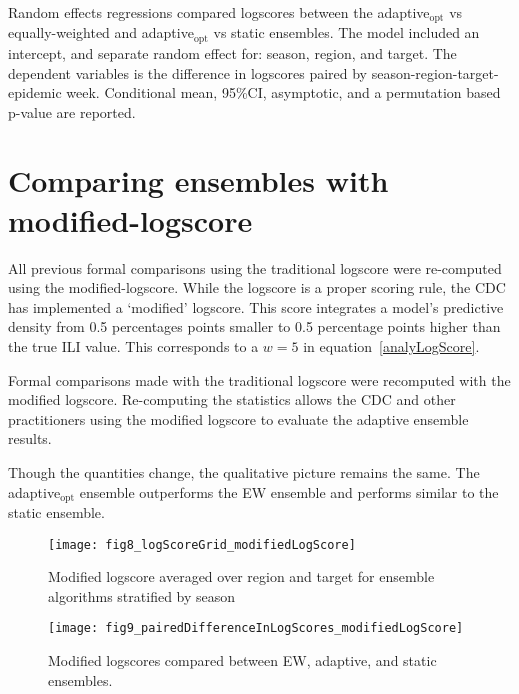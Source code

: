\documentclass[12pt]{article}
\begin{document}
\begin{table}[ht!]
\caption{
Random effects regressions compared logscores between the adaptive$_{\text{opt}}$ vs equally-weighted and adaptive$_{\text{opt}}$ vs static ensembles.
The model included an intercept, and separate random effect for: season, region, and target.
The dependent variables is the difference in logscores paired by season-region-target-epidemic week.
Conditional mean, 95\%CI, asymptotic, and a permutation based p-value are reported.}

\end{table}


\clearpage
\section{Comparing ensembles with modified-logscore}
\label{suppl4.comparison}

All previous formal comparisons using the traditional logscore were re-computed using the modified-logscore.
While the logscore is a proper scoring rule, the CDC has implemented a `modified' logscore.
This score integrates a model's predictive density from 0.5 percentages points smaller to 0.5 percentage points higher than the true ILI value.
This corresponds to a $w=5$ in equation~\ref{analyLogScore}.

Formal comparisons made with the traditional logscore were recomputed with the modified logscore.
Re-computing the statistics allows the CDC and other practitioners using the modified logscore to evaluate the adaptive ensemble results.

Though the quantities change, the qualitative picture remains the same.
The adaptive$_{\text{opt}}$ ensemble outperforms the EW ensemble and performs similar to the static ensemble.

\graphicspath{{../_6_TLGs/_G/fig8_logScoreGrid_modifiedLogScore/}}
\begin{figure}[ht!]
  \centering
  \texttt{[image: fig8\_logScoreGrid\_modifiedLogScore]}
  \caption{ Modified logscore averaged over region and target for ensemble algorithms stratified by season \label{fig8.logScoreGrid__modifiedLogScore}}
\end{figure}

\graphicspath{{../_6_TLGs/_G/fig9_pairedDifferenceInLogScores_modifiedLogScore/}}
\begin{figure}[ht!]
  \centering
  \texttt{[image: fig9\_pairedDifferenceInLogScores\_modifiedLogScore]}
  \caption{Modified logscores compared between EW, adaptive, and static ensembles.  \label{fig9.pairedDifferenceInLogScores__modifiedLogScores}}
\end{figure}
\end{document}
